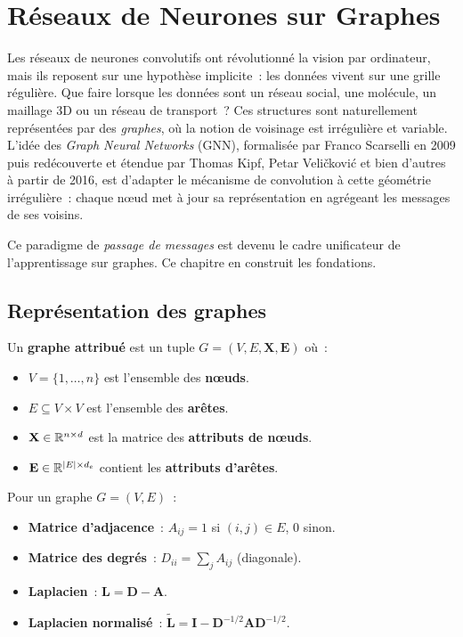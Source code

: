 \chapter{R\'eseaux de Neurones sur Graphes}
\label{ch:gnn}

Les r\'eseaux de neurones convolutifs ont r\'evolutionn\'e la vision par ordinateur, mais ils reposent sur une hypoth\`ese implicite~: les donn\'ees vivent sur une grille r\'eguli\`ere. Que faire lorsque les donn\'ees sont un r\'eseau social, une mol\'ecule, un maillage 3D ou un r\'eseau de transport~? Ces structures sont naturellement repr\'esent\'ees par des \emph{graphes}, o\`u la notion de voisinage est irr\'eguli\`ere et variable. L'id\'ee des \emph{Graph Neural Networks} (GNN), formalis\'ee par Franco Scarselli en 2009 puis red\'ecouverte et \'etendue par Thomas Kipf, Petar Veli\v{c}kovi\'c et bien d'autres \`a partir de 2016, est d'adapter le m\'ecanisme de convolution \`a cette g\'eom\'etrie irr\'eguli\`ere~: chaque n\oe ud met \`a jour sa repr\'esentation en agr\'egeant les messages de ses voisins.

Ce paradigme de \emph{passage de messages} est devenu le cadre unificateur de l'apprentissage sur graphes. Ce chapitre en construit les fondations.

\section{Repr\'esentation des graphes}

\begin{definition}
Un \textbf{graphe attribu\'e} est un tuple $G = (V, E, \mathbf{X}, \mathbf{E})$ o\`u~:
\begin{itemize}
    \item $V = \{1, \ldots, n\}$ est l'ensemble des \textbf{n\oe uds}.
    \item $E \subseteq V \times V$ est l'ensemble des \textbf{ar\^etes}.
    \item $\mathbf{X} \in \mathbb{R}^{n \times d}$ est la matrice des \textbf{attributs de n\oe uds}.
    \item $\mathbf{E} \in \mathbb{R}^{\left| E \right| \times d_e}$ contient les \textbf{attributs d'ar\^etes}.
\end{itemize}
\end{definition}

\begin{definition}
Pour un graphe $G = (V, E)$~:
\begin{itemize}
    \item \textbf{Matrice d'adjacence}~: $A_{ij} = 1$ si $(i,j) \in E$, $0$ sinon.
    \item \textbf{Matrice des degr\'es}~: $D_{ii} = \sum_j A_{ij}$ (diagonale).
    \item \textbf{Laplacien}~: $\mathbf{L} = \mathbf{D} - \mathbf{A}$.
    \item \textbf{Laplacien normalis\'e}~:
          $\tilde{\mathbf{L}} = \mathbf{I} - \mathbf{D}^{-1/2}\mathbf{A}\mathbf{D}^{-1/2}$.
\end{itemize}
\end{definition}

